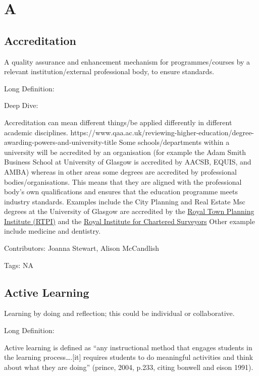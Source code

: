 \documentclass[
  letterpaper,
  DIV=11,
  numbers=noendperiod]{scrreprt}
\begin{document}

\chapter{A}\label{a}

\section{Accreditation}\label{accreditation}

A quality assurance and enhancement mechanism for programmes/courses by
a relevant institution/external professional body, to ensure standards.

Long Definition:

Deep Dive:

Accreditation can mean different things/be applied differently in
different academic disciplines.
https://www.qaa.ac.uk/reviewing-higher-education/degree-awarding-powers-and-university-title
Some schools/departments within a university will be accredited by an
organisation (for example the Adam Smith Business School at University
of Glasgow is accredited by AACSB, EQUIS, and AMBA) whereas in other
areas some degrees are accredited by professional bodies/organisations.
This means that they are aligned with the professional body's own
qualifications and ensures that the education programme meets industry
standards. Examples include the City Planning and Real Estate Msc
degrees at the University of Glasgow are accredited by the
\href{http://www.rtpi.org.uk\%20https://www.rtpi.org.uk/become-a-planner/study-at-university/wales-scotland-and-northern-ireland/}{Royal
Town Planning Institute (RTPI)} and the
\href{https://www.rics.org\%20https://www.rics.org/surveyor-careers/how-to-become-a-surveyor/university-surveying-courses}{Royal
Institute for Chartered Surveyors} Other example include medicine and
dentistry.

Contributors: Joanna Stewart, Alison McCandlish

Tags: NA

\section{Active Learning}\label{active-learning}

Learning by doing and reflection; this could be individual or
collaborative.

Long Definition:

Active learning is defined as ``any instructional method that engages
students in the learning process\ldots.{[}it{]} requires students to do
meaningful activities and think about what they are doing'' (prince,
2004, p.233, citing bonwell and eison 1991).
\end{document}
